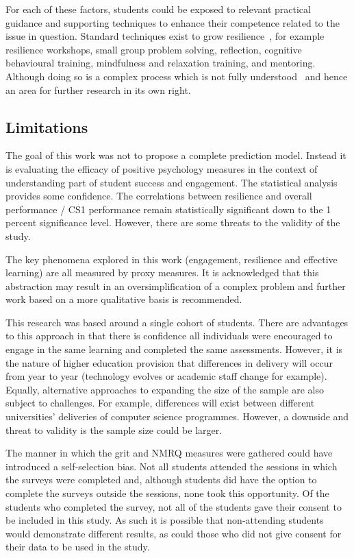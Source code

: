 \documentclass[sigconf]{acmart}
\begin{document}
For each of these factors, students could be exposed to relevant practical guidance and supporting techniques to enhance their competence related to the issue in question. Standard techniques exist to grow resilience~\cite{Walker2006, Vailes2017, Rodgers2016}, for example resilience workshops, small group problem solving, reflection, cognitive behavioural training, mindfulness and relaxation training, and mentoring. Although doing so is a complex process which is not fully understood~\cite{Rodgers2016} and hence an area for further research in its own right.

\subsection {Limitations}
The goal of this work was not to propose a complete prediction model. Instead it is evaluating the efficacy of positive psychology measures in the context of understanding part of student success and engagement. The statistical analysis provides some confidence. The correlations between resilience and overall performance / CS1 performance remain statistically significant down to the 1 percent significance level. However, there are some threats to the validity of the study.

The key phenomena explored in this work (engagement, resilience and effective learning) are all measured by proxy measures. It is acknowledged that this abstraction may result in an oversimplification of a complex problem and further work based on a more qualitative basis is recommended.

This research was based around a single cohort of students. There are advantages to this approach in that there is confidence all individuals were encouraged to engage in the same learning and completed the same assessments. However, it is the nature of higher education provision that differences in delivery will occur from year to year (technology evolves or academic staff change for example). Equally, alternative approaches to expanding the size of the sample are also subject to challenges. For example, differences will exist between different universities' deliveries of computer science programmes. However, a downside and threat to validity is the sample size could be larger. 

The manner in which the grit and NMRQ measures were gathered could have introduced a self-selection bias. Not all students attended the sessions in which the surveys were completed and, although students did have the option to complete the surveys outside the sessions, none took this opportunity. Of the students who completed the survey, not all of the students gave their consent to be included in this study. As such it is possible that non-attending students would demonstrate different results, as could those who did not give consent for their data to be used in the study.
\end{document}
